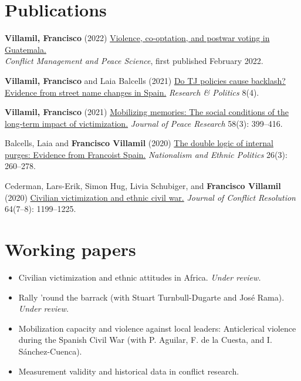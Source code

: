 \documentclass[a4paper, 12pt]{article}
\begin{document}
\section*{Publications}

\begin{etaremune}[leftmargin=12pt, itemsep=0pt]
\item \textbf{Villamil, Francisco} (2022) \href{https://journals.sagepub.com/doi/full/10.1177/07388942211066539}{Violence, co-optation, and postwar voting in Guatemala.}\\\textit{Conflict Management and Peace Science}, first published February 2022.
\item \textbf{Villamil, Francisco} and Laia Balcells (2021) \href{https://journals.sagepub.com/doi/full/10.1177/20531680211058550}{Do TJ policies cause backlash? Evidence from street name changes in Spain.} \textit{Research \& Politics} 8(4).
\item \textbf{Villamil, Francisco} (2021) \href{https://doi.org/10.1177/0022343320912816}{Mobilizing memories: The social conditions of the long-term impact of victimization.} \textit{Journal of Peace Research} 58(3): 399--416.
\item Balcells, Laia and \textbf{Francisco Villamil} (2020) \href{https://doi.org/10.1080/13537113.2020.1795451}{The double logic of internal purges: Evidence from Francoist Spain.} \textit{Nationalism and Ethnic Politics} 26(3): 260--278.
\item Cederman, Lars-Erik, Simon Hug, Livia Schubiger, and \textbf{Francisco Villamil} (2020) \href{https://doi.org/10.1177/0022002719898873}{Civilian victimization and ethnic civil war.} \textit{Journal of Conflict Resolution} 64(7--8): 1199--1225.
\end{etaremune}

\clearpage
\section*{Working papers}

\begin{itemize}[leftmargin=*, nolistsep]
\item Civilian victimization and ethnic attitudes in Africa. \textit{Under review.}
\item Rally 'round the barrack (with Stuart Turnbull-Dugarte and José Rama). \textit{Under review.}
\item Mobilization capacity and violence against local leaders: Anticlerical violence during the Spanish Civil War (with P. Aguilar, F. de la Cuesta, and I. Sánchez-Cuenca).
\item Measurement validity and historical data in conflict research.
\end{itemize}
\end{document}

